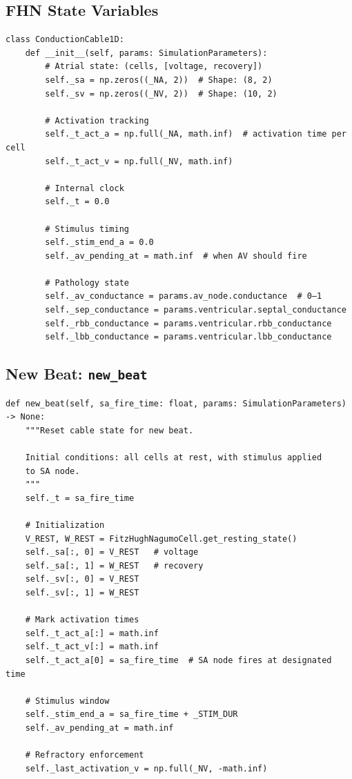 \documentclass[12pt,a4paper,oneside]{book}
\begin{document}
\subsection{FHN State Variables}

\begin{Verbatim}[formatcom=\color{black}]
class ConductionCable1D:
    def __init__(self, params: SimulationParameters):
        # Atrial state: (cells, [voltage, recovery])
        self._sa = np.zeros((_NA, 2))  # Shape: (8, 2)
        self._sv = np.zeros((_NV, 2))  # Shape: (10, 2)
        
        # Activation tracking
        self._t_act_a = np.full(_NA, math.inf)  # activation time per cell
        self._t_act_v = np.full(_NV, math.inf)
        
        # Internal clock
        self._t = 0.0
        
        # Stimulus timing
        self._stim_end_a = 0.0
        self._av_pending_at = math.inf  # when AV should fire
        
        # Pathology state
        self._av_conductance = params.av_node.conductance  # 0–1
        self._sep_conductance = params.ventricular.septal_conductance
        self._rbb_conductance = params.ventricular.rbb_conductance
        self._lbb_conductance = params.ventricular.lbb_conductance
\end{Verbatim}

\subsection{New Beat: \texttt{new\_beat}}

\begin{Verbatim}[formatcom=\color{black}]
def new_beat(self, sa_fire_time: float, params: SimulationParameters) -> None:
    """Reset cable state for new beat.
    
    Initial conditions: all cells at rest, with stimulus applied
    to SA node.
    """
    self._t = sa_fire_time
    
    # Initialization
    V_REST, W_REST = FitzHughNagumoCell.get_resting_state()
    self._sa[:, 0] = V_REST   # voltage
    self._sa[:, 1] = W_REST   # recovery
    self._sv[:, 0] = V_REST
    self._sv[:, 1] = W_REST
    
    # Mark activation times
    self._t_act_a[:] = math.inf
    self._t_act_v[:] = math.inf
    self._t_act_a[0] = sa_fire_time  # SA node fires at designated time
    
    # Stimulus window
    self._stim_end_a = sa_fire_time + _STIM_DUR
    self._av_pending_at = math.inf
    
    # Refractory enforcement
    self._last_activation_v = np.full(_NV, -math.inf)
\end{Verbatim}
\end{document}
